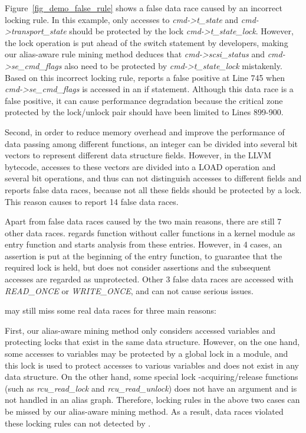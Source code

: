 Figure~\ref{fig_demo_false_rule} shows a false data race caused by an incorrect 
locking rule. In this example, only accesses to {\em cmd->t\_state} and {\em 
cmd->transport\_state} should be protected by the lock {\em 
cmd->t\_state\_lock}. However, the lock operation is put ahead of the switch 
statement by developers, making our alias-aware rule mining method deduces that 
{\em cmd->scsi\_status} and {\em cmd->se\_cmd\_flags} also need to be protected 
by {\em cmd->t\_state\_lock} mistakenly. Based on this incorrect locking rule, 
\sys reports a false positive at Line 745 when {\em cmd->se\_cmd\_flags} is 
accessed in an if statement. Although this data race is a false positive, it 
can cause performance degradation because the critical zone protected by the 
lock/unlock pair should have been limited to Lines 899-900.

Second, in order to reduce memory overhead and improve the performance of data 
passing among different functions, an integer can be divided into several bit 
vectors to represent different data structure fields. However, in the LLVM 
bytecode, accesses to these vectors are divided into a LOAD operation and 
several bit operations, and thus \sys can not distinguish accesses to different 
fields and reports false data races, because not all these fields should be 
protected by a lock. This reason causes \sys to report 14 false data races.

Apart from false data races caused by the two main reasons, there are still 7 
other data races. \sys regards function without caller functions in a kernel 
module as entry function and starts analysis from these entries. However, in 4 
cases, an assertion is put at the beginning of the entry function, to guarantee 
that the required lock is held, but \sys does not consider assertions and the 
subsequent accesses are regarded as unprotected. Other 3 false data races are 
accessed with {\em READ\_ONCE} or {\em WRITE\_ONCE}, and can not cause serious 
issues.

 \sys may still miss some real data races for three main 
reasons:

First, our alias-aware mining method only considers accessed variables and 
protecting locks that exist in the same data structure. However, on the one 
hand, some accesses to variables may be protected by a global lock in a module, 
and this lock is used to protect accesses to various variables and does 
not exist in any data structure. On the other hand, some special lock 
-acquiring/release functions (such as {\em rcu\_read\_lock} and {\em 
rcu\_read\_unlock}) does not have an argument and is not handled in an alias 
graph. Therefore, locking rules in the above two cases can be missed by our 
alias-aware mining method. As a result, data races violated these locking rules 
can not detected by \sys.

